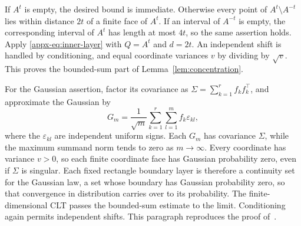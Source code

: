 \documentclass[11pt,letterpaper]{article}
\newif\ifshowrev
\newcommand{\rev}[1]{\ifshowrev{\color{revblue}%
\hypersetup{linkcolor=revblue,citecolor=revblue,urlcolor=revblue}#1}\else#1\fi}
\newcommand{\rs}[1]{\ifshowrev{\color{revblue}#1}\else#1\fi}
\newif\ifshowpass
\newcommand{\pass}[1]{\ifshowpass{\color{revblue}%
\hypersetup{linkcolor=revblue,citecolor=revblue,urlcolor=revblue}#1}\else#1\fi}
\newif\ifshownat
\newcommand{\nat}[1]{\ifshownat{\color{revblue}%
\hypersetup{linkcolor=revblue,citecolor=revblue,urlcolor=revblue}#1}\else#1\fi}
\theoremstyle{remark}
\begin{document}
If \(A^{\rs t}\) is empty, the desired bound is immediate. Otherwise every
point of \(A^{\rs t}\setminus A^{-\rs t}\) lies within distance \(2\rs t\)
of a finite face of \(A^{\rs t}\). If an interval of \(A^{-\rs t}\) is empty,
the corresponding interval of \(A^{\rs t}\) has length at most \(4\rs t\), so
the same assertion holds. Apply \eqref{appx-eq:inner-layer} with
\(Q=A^{\rs t}\) and \(d=2\rs t\). An independent shift is handled by
conditioning, and equal coordinate variances \(v\) by dividing by
\(\sqrt v\). This proves the bounded-sum part of
Lemma~\rev{\ref{lem:concentration}}.

For the Gaussian assertion, factor its covariance as
\(\Sigma=\sum_{k=1}^r \rs{f_k}\rs{f_k}^\top\), and approximate the Gaussian by
\[
 G_m=\frac1{\sqrt m}\sum_{k=1}^r\sum_{l=1}^m \rs{f_k}\varepsilon_{kl},
\]
where the \(\varepsilon_{kl}\) are independent uniform signs.
\pass{Each \(G_m\) has} covariance \(\Sigma\), while the maximum
summand norm tends to zero\pass{ as \(m\to\infty\)}. Every coordinate has variance \(v>0\), so each finite coordinate face
has Gaussian probability zero, even if \(\Sigma\) is singular. Each
fixed rectangle boundary layer is therefore a continuity set for the
Gaussian law\rev{, a set whose boundary has Gaussian probability zero, so
that convergence in distribution carries over to its probability}. The finite-dimensional CLT passes the bounded-sum estimate
to the limit. Conditioning again permits independent shifts.
\rev{This paragraph reproduces \nat{the proof of~\cite[Corollary~2.2]{AL}}.}


\endgroup

\end{document}
